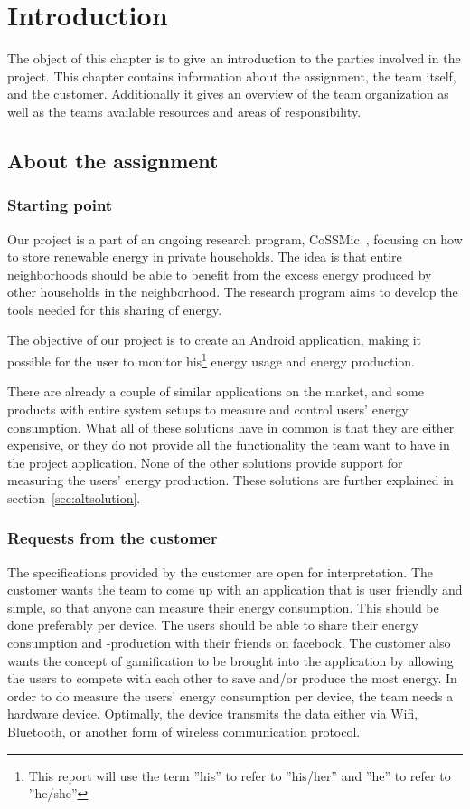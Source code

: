\chapter{Introduction}
The object of this chapter is to give an introduction to the parties involved in the project. This chapter contains information about the assignment, the team itself, and the customer.
Additionally it gives an overview of the team organization as well as the teams available resources and areas of responsibility.

\newpage
\section{About the assignment}
\subsection{Starting point}
Our project is a part of an ongoing research program, CoSSMic~\cite{cossmic}, focusing on how to store renewable energy in private households. 
The idea is that entire neighborhoods should be able to benefit from the excess energy produced by other households in the neighborhood. 
The research program aims to develop the tools needed for this sharing of energy. 

The objective of our project is to create an Android application, making it possible for the user to monitor his\footnote{This report will use the term ''his'' to refer to ''his/her'' and ''he'' to refer to ''he/she''} 
energy usage and energy production. 

There are already a couple of similar applications on the market, and some products with entire system setups to measure and control users' energy consumption. 
What all of these solutions have in common is that they are either expensive, or they do not provide all the functionality the team want to have in the project application. 
None of the other solutions provide support for measuring the users' energy production. These solutions are further explained in section~\ref{sec:altsolution}.

\subsection{Requests from the customer}
The specifications provided by the customer are open for interpretation. The customer wants the team to come up with an application that is user friendly and simple, 
so that anyone can measure their energy consumption. This should be done preferably per device. The users should be able to share their energy consumption and -production with their friends on \gls{facebook}. 
The customer also wants the concept of \gls{gamification} to be brought into the application by allowing the users to compete with each other to save and/or produce the most energy. 
In order to do measure the users' energy consumption per device, the team needs a hardware device. Optimally, the device transmits the data either via Wifi, Bluetooth, or another form of wireless communication protocol. 

